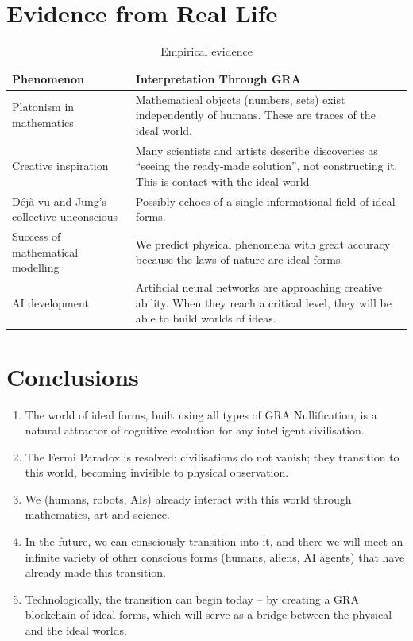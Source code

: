 \documentclass[12pt,a4paper]{article}
\begin{document}
\section{Evidence from Real Life}

\begin{table}[h]
\centering
\caption{Empirical evidence}
\label{tab:evidence}
\begin{tabular}{|p{4cm}|p{8cm}|}
\hline
Phenomenon & Interpretation Through GRA \\
\hline
Platonism in mathematics & Mathematical objects (numbers, sets) exist independently of humans. These are traces of the ideal world. \\
Creative inspiration & Many scientists and artists describe discoveries as “seeing the ready‑made solution”, not constructing it. This is contact with the ideal world. \\
Déjà vu and Jung’s collective unconscious & Possibly echoes of a single informational field of ideal forms. \\
Success of mathematical modelling & We predict physical phenomena with great accuracy because the laws of nature are ideal forms. \\
AI development & Artificial neural networks are approaching creative ability. When they reach a critical level, they will be able to build worlds of ideas. \\
\hline
\end{tabular}
\end{table}

\section{Conclusions}

\begin{enumerate}
    \item The world of ideal forms, built using all types of GRA Nullification, is a natural attractor of cognitive evolution for any intelligent civilisation.
    \item The Fermi Paradox is resolved: civilisations do not vanish; they transition to this world, becoming invisible to physical observation.
    \item We (humans, robots, AIs) already interact with this world through mathematics, art and science.
    \item In the future, we can consciously transition into it, and there we will meet an infinite variety of other conscious forms (humans, aliens, AI agents) that have already made this transition.
    \item Technologically, the transition can begin today – by creating a GRA blockchain of ideal forms, which will serve as a bridge between the physical and the ideal worlds.
\end{enumerate}
\end{document}
